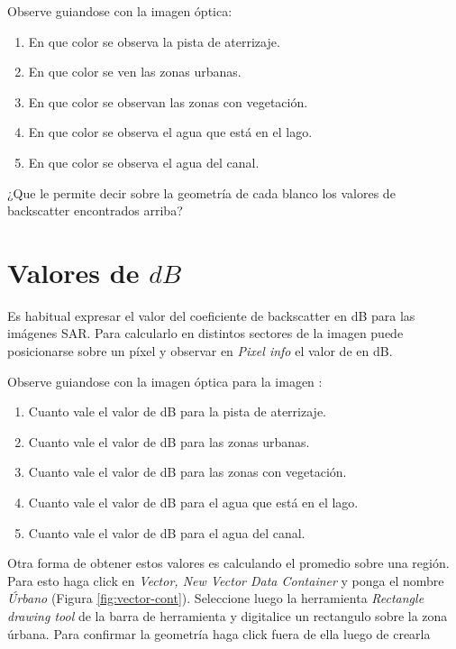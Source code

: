 Observe guiandose con la imagen óptica:

\begin{enumerate}
    \item En que color se observa la pista de aterrizaje.
    \item En que color se ven las zonas urbanas.
    \item En que color se observan las zonas con vegetación.
    \item En que color se observa el agua que está en el lago.
    \item En que color se observa el agua del canal.
\end{enumerate}

\begin{que}
    ¿Que le permite decir sobre la geometría de cada blanco los valores de backscatter encontrados arriba?
\end{que}

\section{Valores de $dB$}

Es habitual expresar el valor del coeficiente de backscatter en dB para las imágenes SAR. Para calcularlo en distintos sectores de la imagen puede posicionarse sobre un píxel y observar en \emph{Pixel info} el valor de  en dB.

Observe guiandose con la imagen óptica para la imagen :

\begin{enumerate}
    \item Cuanto vale el valor de dB para la pista de aterrizaje.
    \item Cuanto vale el valor de dB para las zonas urbanas.
    \item Cuanto vale el valor de dB para las zonas con vegetación.
    \item Cuanto vale el valor de dB para el agua que está en el lago.
    \item Cuanto vale el valor de dB para el agua del canal.
\end{enumerate}

Otra forma de obtener estos valores es calculando el promedio sobre una región. Para esto haga click en \emph{Vector, New Vector Data Container} y ponga el nombre \emph{Úrbano} (Figura \ref{fig:vector-cont}). Seleccione luego la herramienta \emph{Rectangle drawing tool} de la barra de herramienta y digitalice un rectangulo sobre la zona úrbana. Para confirmar la geometría haga click fuera de ella luego de crearla

